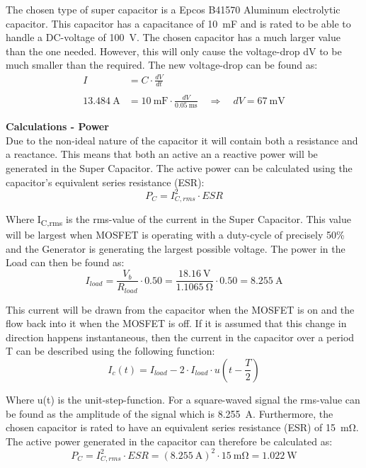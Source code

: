 The chosen type of super capacitor is a Epcos B41570 Aluminum electrolytic capacitor. This capacitor has a capacitance of \SI{10}{\milli \farad} and is rated to be able to handle a DC-voltage of \SI{100}{\volt}. The chosen capacitor has a much larger value than the one needed. However, this will only cause the voltage-drop dV to be much smaller than the required. The new voltage-drop can be found as:
\begin{equation}
	\begin{split}
		I &= C \cdot \frac{dV}{dt}\\
		\\
	\SI{13.484}{\ampere} &= \SI{10}{\milli \farad} \cdot \frac{dV}{\SI{0.05}{\milli \second}} \quad \Rightarrow \quad dV = \SI{67}{\milli \volt}
	\end{split}
\end{equation}

\textbf{Calculations - Power}\\
Due to the non-ideal nature of the capacitor it will contain both a resistance and a reactance. This means that both an active an a reactive power will be generated in the Super Capacitor. The active power can be calculated using the capacitor's equivalent series resistance (ESR):
\begin{equation}
	P_C = I_{C,rms}^2 \cdot ESR
\end{equation}

Where I\textsubscript{C,rms} is the rms-value of the current in the Super Capacitor. This value will be largest when MOSFET is operating with a duty-cycle of precisely 50\% and the Generator is generating the largest possible voltage. The power in the Load can then be found as:
\begin{equation}
	I_{load} = \frac{V_b}{R_{load}} \cdot 0.50 = \frac{\SI{18.16}{\volt}}{\SI{1.1065}{\ohm}} \cdot 0.50 = \SI{8.255}{\ampere}
\end{equation}

This current will be drawn from the capacitor when the MOSFET is on and the flow back into it when the MOSFET is off. If it is assumed that this change in direction happens instantaneous, then the current in the capacitor over a period T can be described using the following function:
\begin{equation}
	I_c(t) = I_{load} - 2 \cdot I_{load} \cdot u \left( t - \frac{T}{2} \right)
\end{equation}

Where u(t) is the unit-step-function. For a square-waved signal the rms-value can be found as the amplitude of the signal which is \SI{8.255}{\ampere}. Furthermore, the chosen capacitor is rated to have an equivalent series resistance (ESR) of \SI{15}{\milli \ohm}. The active power generated in the capacitor can therefore be calculated as:
\begin{equation}
	P_C = I_{C,rms}^2 \cdot ESR = (\SI{8.255}{\ampere})^2 \cdot \SI{15}{\milli \ohm} = \SI{1.022}{\watt}
\end{equation}

